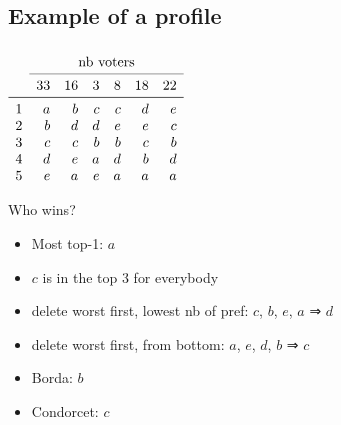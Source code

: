 \documentclass[french,english]{beamer}
\begin{document}
\subsection{Example of a profile}
\begin{frame}[fragile]
	\frametitle{\subsecname}
	\begin{center}
		$\begin{array}{lrrrrrr}
			&\multicolumn{6}{c}{\text{nb voters}}\\
		\cmidrule{2-7}
				&33	&16	&3	&8	&18	&22	\\
		\midrule
			1	&a	&b	&c	&c	&d	&e	\\
			2	&b	&d	&d	&e	&e	&c	\\
			3	&c	&c	&b	&b	&c	&b	\\
			4	&d	&e	&a	&d	&b	&d	\\
			5	&e	&a	&e	&a	&a	&a	\\
		\end{array}$
	\end{center}
	Who wins?
	\begin{itemize}
		\item Most top-1: $a$
		\item $c$ is in the top 3 for everybody
		\item delete worst first, lowest nb of pref: $c$, $b$, $e$, $a$ ⇒ $d$
		\item delete worst first, from bottom: $a$, $e$, $d$, $b$ ⇒ $c$
		\item Borda: $b$
		\item Condorcet: $c$
	\end{itemize}
\end{frame}
\end{document}
